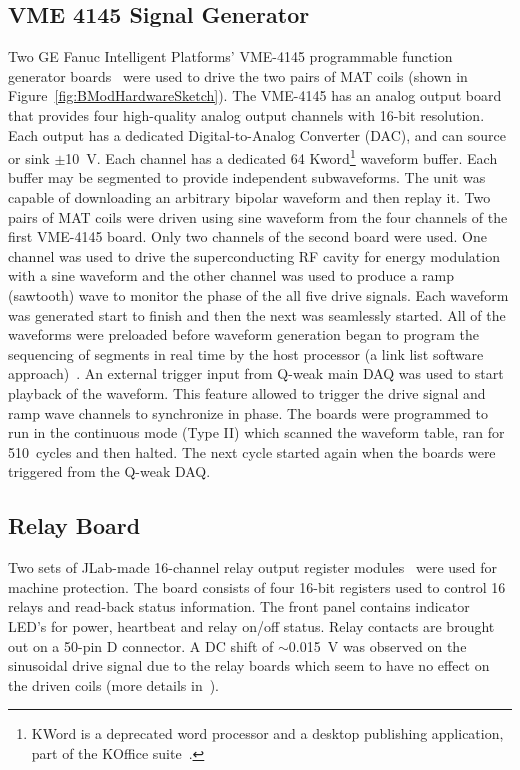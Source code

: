 \subsection{VME 4145 Signal Generator}
\label{VME 4145 Signal Generator}
Two GE Fanuc Intelligent Platforms' VME-4145 programmable function generator boards~\cite{manual_vmivme4145} were used to drive the two pairs of MAT coils (shown in Figure~\ref{fig:BModHardwareSketch}). The VME-4145 has an analog output board that provides four high-quality analog output channels with 16-bit resolution. Each output has a dedicated Digital-to-Analog Converter (DAC), and can source or sink $\pm$10~V. Each channel has a dedicated 64 Kword\footnote{KWord is a deprecated word processor and a desktop publishing application, part of the KOffice suite~\cite{website:kword}.} waveform buffer. Each buffer may be segmented to provide independent subwaveforms. The unit was capable of downloading an arbitrary bipolar waveform and then replay it. Two pairs of MAT coils were driven using sine waveform from the four channels of the first VME-4145 board. Only two channels of the second board were used. One channel was used to drive the superconducting RF cavity for energy modulation with a sine waveform and the other channel was used to produce a ramp (sawtooth) wave to monitor the phase of the all five drive signals. Each waveform was generated start to finish and then the next was seamlessly started. All of the waveforms were preloaded before waveform generation began to program the sequencing of segments in real time by the host processor (a link list software approach)~\cite{manual_vmivme4145}. An external trigger input from Q-weak main DAQ was used to start playback of the waveform. This feature allowed to trigger the drive signal and ramp wave channels to synchronize in phase. The boards were programmed to run in the continuous mode (Type II) which scanned the waveform table, ran for 510~cycles and then halted. The next cycle started again when the boards were triggered from the Q-weak DAQ. 


\subsection{Relay Board}
\label{Relay Board}
Two sets of JLab-made 16-channel relay output register modules~\cite{jlab_relay} were used for machine protection. The board consists of four 16-bit registers used to control 16 relays and read-back status information. The front panel contains indicator LED's for power, heartbeat and relay on/off status. Relay contacts are brought out on a 50-pin D connector.
A DC shift of $\sim$0.015~V was observed on the sinusoidal drive signal due to the relay boards which seem to have no effect on the driven coils (more details in~\cite{presentation:nur_bmod_1312}).

